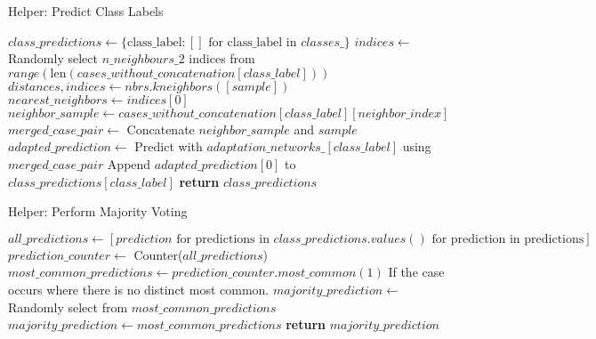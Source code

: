 \documentclass[a4paper, 12pt]{report}
\begin{document}
\begin{algorithm}[H]
    \caption{Helper: Predict Class Labels}
    \label{alg:predict_class}
    \begin{algorithmic}[1]
            \State $class\_predictions \gets \{\text{class\_label}: [] \text{ for class\_label in } classes\_\}$
                    \State $indices \gets$ Randomly select $n\_neighbours\_2$ indices from $range(\text{len}(cases\_without\_concatenation[class\_label]))$
                \Else
                    \State $distances, indices \gets nbrs.kneighbors([sample])$
                \EndIf
                \State $nearest\_neighbors \gets indices[0]$
                    \State $neighbor\_sample \gets cases\_without\_concatenation[class\_label][neighbor\_index]$
                    \State $merged\_case\_pair \gets$ Concatenate $neighbor\_sample$ and $sample$
                    \State $adapted\_prediction \gets$ Predict with $adaptation\_networks\_[class\_label]$ using $merged\_case\_pair$
                    \State Append $adapted\_prediction[0]$ to $class\_predictions[class\_label]$
                \EndFor
            \EndFor
            \State \textbf{return} $class\_predictions$
        \EndFunction
    \end{algorithmic}
\end{algorithm}

\begin{algorithm}[H]
    \caption{Helper: Perform Majority Voting}
    \label{alg:majority_vote}
    \begin{algorithmic}[1]
            \State $all\_predictions \gets [prediction \text{ for predictions in } class\_predictions.values() \text{ for prediction in predictions}]$
            \State $prediction\_counter \gets$ Counter($all\_predictions$)
            \State $most\_common\_predictions \gets prediction\_counter.most\_common(1)$
            \State If the case occurs where there is no distinct most common.
                \State $majority\_prediction \gets$ Randomly select from $most\_common\_predictions$
            \Else
                \State $majority\_prediction \gets most\_common\_predictions$
            \EndIf
            \State \textbf{return} $majority\_prediction$
        \EndFunction
    \end{algorithmic}
\end{algorithm}
\end{document}
